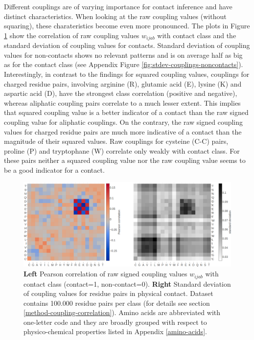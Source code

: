\documentclass[11pt,a4paper,twoside]{book}
\newcommand{\wijab}{w_{ijab}}
\theoremstyle{definition}
\theoremstyle{definition}
\theoremstyle{remark}
\begin{document}
Different couplings are of varying importance for contact inference and
have distinct characteristics. When looking at the raw coupling values
(without squaring), these charateristics become even more pronounced.
The plots in Figure \ref{fig:coupling-correlation} show the correlation
of raw coupling values \(\wijab\) with contact class and the standard
deviation of coupling values for contacts. Standard deviation of
coupling values for non-contacts shows no relevant patterns and is on
average half as big as for the contact class (see Appendix Figure
\ref{fig:stdev-couplings-noncontacts}). Interestingly, in contrast to
the findings for squared coupling values, couplings for charged residue
pairs, involving arginine (R), glutamic acid (E), lysine (K) and
aspartic acid (D), have the strongest class correlation (positive and
negative), whereas aliphatic coupling pairs correlate to a much lesser
extent. This implies that squared coupling value is a better indicator
of a contact than the raw signed coupling value for aliphatic couplings.
On the contrary, the raw signed coupling values for charged residue
pairs are much more indicative of a contact than the magnitude of their
squared values. Raw couplings for cysteine (C-C) pairs, proline (P) and
tryptophane (W) correlate only weakly with contact class. For these
pairs neither a squared coupling value nor the raw coupling value seems
to be a good indicator for a contact.










\begin{figure}
\includegraphics[width=1\linewidth]{img/coupling_matrix_analysis/combi_couplings_correlation_and_stddev_heatmap_notitle} \caption{\textbf{Left} Pearson correlation of
raw signed coupling values \(\wijab\) with contact class (contact=1,
non-contact=0). \textbf{Right} Standard deviation of coupling values for
residue pairs in physical contact. Dataset contains 100.000 residue
pairs per class (for details see section
\ref{method-coupling-correlation}). Amino acids are abbreviated with
one-letter code and they are broadly grouped with respect to
physico-chemical properties listed in Appendix \ref{amino-acids}.}\label{fig:coupling-correlation}
\end{figure}
\end{document}

